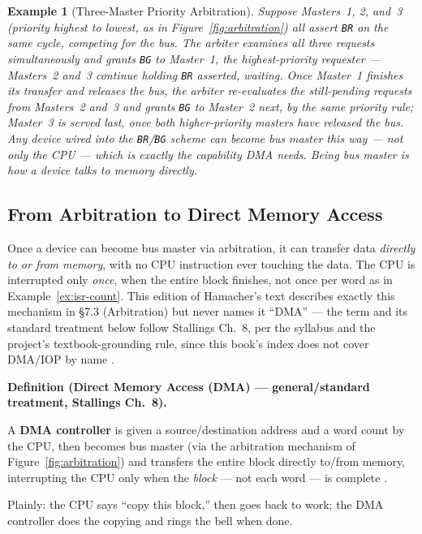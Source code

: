 \documentclass[11pt]{article}
\newtheorem{example}{Example}[section]
\newenvironment{definitionbox}[1]{%
  \par\noindent\textbf{Definition (#1).}\ \itshape
}{\par\vspace{0.3em}}
\begin{document}
\begin{example}[Three-Master Priority Arbitration]
\label{ex:arbitration}
Suppose Masters~1, 2, and~3 (priority highest to lowest, as in Figure~\ref{fig:arbitration}) all assert \texttt{BR} on the same cycle, competing for the bus. The arbiter examines all three requests simultaneously and grants \texttt{BG} to Master~1, the highest-priority requester --- Masters~2 and~3 continue holding \texttt{BR} asserted, waiting. Once Master~1 finishes its transfer and releases the bus, the arbiter re-evaluates the still-pending requests from Masters~2 and~3 and grants \texttt{BG} to Master~2 next, by the same priority rule; Master~3 is served last, once both higher-priority masters have released the bus. Any device wired into the \texttt{BR}/\texttt{BG} scheme can become bus master this way --- not only the CPU --- which is exactly the capability DMA needs. Being bus master is how a device talks to memory \emph{directly}.
\end{example}

\subsection{From Arbitration to Direct Memory Access}

Once a device can become bus master via arbitration, it can transfer data \emph{directly to or from memory}, with no CPU instruction ever touching the data. The CPU is interrupted only \emph{once}, when the entire block finishes, not once per word as in Example~\ref{ex:isr-count}. This edition of Hamacher's text describes exactly this mechanism in \S7.3 (Arbitration) but never names it ``DMA'' --- the term and its standard treatment below follow Stallings Ch.~8, per the syllabus and the project's textbook-grounding rule, since this book's index does not cover DMA/IOP by name \cite{Hamacher2002_computer_organization}.

\begin{definitionbox}{Direct Memory Access (DMA) --- general/standard treatment, Stallings Ch.~8}
A \textbf{DMA controller} is given a source/destination address and a word count by the CPU, then becomes bus master (via the arbitration mechanism of Figure~\ref{fig:arbitration}) and transfers the entire block directly to/from memory, interrupting the CPU only when the \emph{block} --- not each word --- is complete \cite{Stallings2015_computer_organization}.
\end{definitionbox}

Plainly: the CPU says ``copy this block,'' then goes back to work; the DMA controller does the copying and rings the bell when done.
\end{document}
